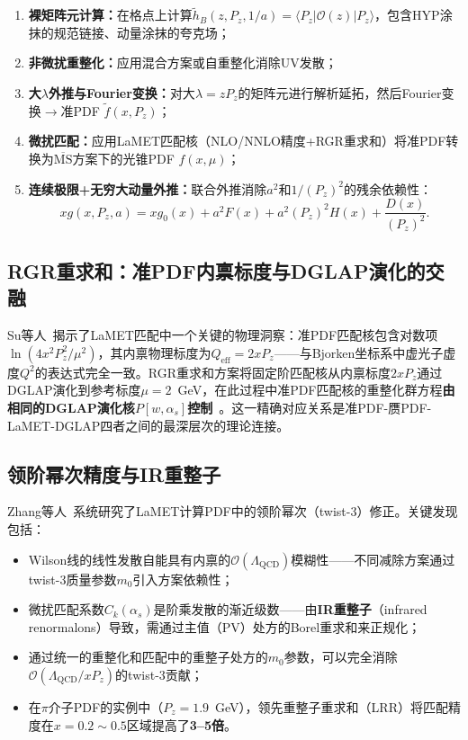 \documentclass[12pt,a4paper]{ctexart}
\theoremstyle{definition}
\begin{document}
\begin{enumerate}[leftmargin=*,nosep]
    \item \textbf{裸矩阵元计算：}在格点上计算$\tilde h_B(z, P_z, 1/a) = \langle P_z | \mathcal{O}(z) | P_z \rangle$，包含HYP涂抹的规范链接、动量涂抹的夸克场；
    \item \textbf{非微扰重整化：}应用混合方案或自重整化消除UV发散；
    \item \textbf{大$\lambda$外推与Fourier变换：}对大$\lambda = z P_z$的矩阵元进行解析延拓，然后Fourier变换$\to$准PDF $\tilde f(x, P_z)$；
    \item \textbf{微扰匹配：}应用LaMET匹配核（NLO/NNLO精度+RGR重求和）将准PDF转换为$\overline{\text{MS}}$方案下的光锥PDF $f(x, \mu)$；
    \item \textbf{连续极限+无穷大动量外推：}联合外推消除$a^2$和$1/(P_z)^2$的残余依赖性：
    \begin{equation}
    xg(x, P_z, a) = xg_0(x) + a^2 F(x) + a^2 (P_z)^2 H(x) + \frac{D(x)}{(P_z)^2}.
    \label{eq:joint_extrapolation}
    \end{equation}
\end{enumerate}

\subsection{RGR重求和：准PDF内禀标度与DGLAP演化的交融}

Su等人~\cite{Su2023RGR}揭示了LaMET匹配中一个关键的物理洞察：准PDF匹配核包含对数项$\ln(4x^2P_z^2/\mu^2)$，其内禀物理标度为\textbf{$Q_{\text{eff}} = 2xP_z$}——与Bjorken坐标系中虚光子虚度$Q^2$的表达式完全一致。RGR重求和方案将固定阶匹配核从内禀标度$2xP_z$通过DGLAP演化到参考标度$\mu=2$~GeV，在此过程中准PDF匹配核的重整化群方程\textbf{由相同的DGLAP演化核$P[w,\alpha_s]$控制}~\cite{Su2023RGR}。这一精确对应关系是准PDF-赝PDF-LaMET-DGLAP四者之间的最深层次的理论连接。

\subsection{领阶幂次精度与IR重整子}

Zhang等人~\cite{Zhang2023leadingPower}系统研究了LaMET计算PDF中的领阶幂次（twist-3）修正。关键发现包括：
\begin{itemize}[nosep]
    \item Wilson线的线性发散自能具有内禀的$\mathcal{O}(\Lambda_{\text{QCD}})$模糊性——不同减除方案通过twist-3质量参数$m_0$引入方案依赖性；
    \item 微扰匹配系数$C_k(\alpha_s)$是阶乘发散的渐近级数——由\textbf{IR重整子}（infrared renormalons）导致，需通过主值（PV）处方的Borel重求和来正规化；
    \item 通过统一的重整化和匹配中的重整子处方的$m_0$参数，可以完全消除$\mathcal{O}(\Lambda_{\text{QCD}}/xP_z)$的twist-3贡献；
    \item 在$\pi$介子PDF的实例中（$P_z=1.9$~GeV），领先重整子重求和（LRR）将匹配精度在$x=0.2\sim0.5$区域提高了\textbf{3--5倍}。
\end{itemize}
\end{document}
